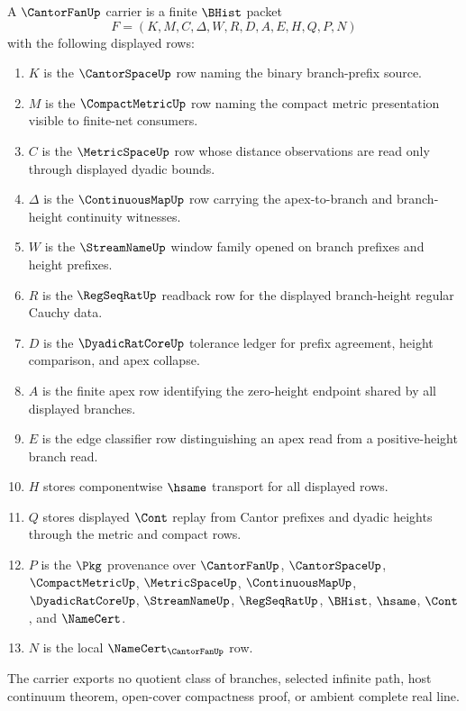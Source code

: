 \begin{definition}
\label{def:cantor-fan-carrier}
A $\CantorFanUp$ carrier is a finite $\BHist$ packet
$$
F=(K,M,C,\Delta,W,R,D,A,E,H,Q,P,N)
$$
with the following displayed rows:
\begin{enumerate}
\item $K$ is the $\CantorSpaceUp$ row naming the binary branch-prefix source.
\item $M$ is the $\CompactMetricUp$ row naming the compact metric presentation visible to finite-net consumers.
\item $C$ is the $\MetricSpaceUp$ row whose distance observations are read only through displayed dyadic bounds.
\item $\Delta$ is the $\ContinuousMapUp$ row carrying the apex-to-branch and branch-height continuity witnesses.
\item $W$ is the $\StreamNameUp$ window family opened on branch prefixes and height prefixes.
\item $R$ is the $\RegSeqRatUp$ readback row for the displayed branch-height regular Cauchy data.
\item $D$ is the $\DyadicRatCoreUp$ tolerance ledger for prefix agreement, height comparison, and apex collapse.
\item $A$ is the finite apex row identifying the zero-height endpoint shared by all displayed branches.
\item $E$ is the edge classifier row distinguishing an apex read from a positive-height branch read.
\item $H$ stores componentwise $\hsame$ transport for all displayed rows.
\item $Q$ stores displayed $\Cont$ replay from Cantor prefixes and dyadic heights through the metric and compact rows.
\item $P$ is the $\Pkg$ provenance over $\CantorFanUp$, $\CantorSpaceUp$, $\CompactMetricUp$, $\MetricSpaceUp$, $\ContinuousMapUp$, $\DyadicRatCoreUp$, $\StreamNameUp$, $\RegSeqRatUp$, $\BHist$, $\hsame$, $\Cont$, and $\NameCert$.
\item $N$ is the local $\NameCert_{\CantorFanUp}$ row.
\end{enumerate}
The carrier exports no quotient class of branches, selected infinite path, host continuum theorem, open-cover compactness proof, or ambient complete real line.
\end{definition}

